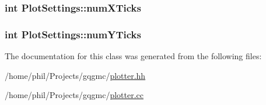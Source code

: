 \hypertarget{class_plot_settings_a6cb8aae67d8e1fc60ccb61f50b37bf0c}{
\subsubsection[{num\-X\-Ticks}]{\setlength{\rightskip}{0pt plus 5cm}int {\bf \-Plot\-Settings\-::num\-X\-Ticks}}}\label{class_plot_settings_a6cb8aae67d8e1fc60ccb61f50b37bf0c}
\hypertarget{class_plot_settings_a8951d83f460971da1fa7d582a510e19c}{
\subsubsection[{num\-Y\-Ticks}]{\setlength{\rightskip}{0pt plus 5cm}int {\bf \-Plot\-Settings\-::num\-Y\-Ticks}}}\label{class_plot_settings_a8951d83f460971da1fa7d582a510e19c}


\-The documentation for this class was generated from the following files\-:\begin{DoxyCompactItemize}
\item 
/home/phil/\-Projects/gqgmc/\hyperlink{plotter_8hh}{plotter.\-hh}\item 
/home/phil/\-Projects/gqgmc/\hyperlink{plotter_8cc}{plotter.\-cc}\end{DoxyCompactItemize}
